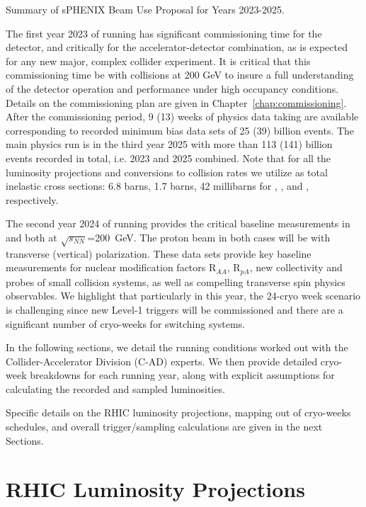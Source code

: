 \begin{table}[]
\centering
\caption{Summary of sPHENIX Beam Use Proposal for Years 2023-2025.
\label{tab:summary}}
\bigskip
\centering

\end{table}

The first year 2023 of running has significant commissioning time for the detector, and critically for the accelerator-detector combination, as is expected for any new major, complex collider experiment.   It is critical that this commissioning time be with \auau collisions at 200 GeV to insure a full understanding of the detector operation and performance under high occupancy conditions.   Details on the commissioning plan are given in Chapter~\ref{chap:commissioning}.    After the commissioning period, 9 (13) weeks of physics data taking are available corresponding to recorded \auau minimum bias data sets of 25 (39) billion events.   The main \auau physics run is in the third year 2025 with more than 113 (141) billion events recorded in total, i.e. 2023 and 2025 combined.
Note that for all the luminosity projections and conversions to collision rates we utilize as total inelastic cross sections:   6.8 barns, 1.7 barns, 42 millibarns for \auau, \pau, and \pp, respectively.

The second year 2024 of running provides the critical baseline measurements in \pp and \pau both at $\sqrt{s_{NN}}$=200~GeV.   The proton beam in both cases will be with transverse (vertical) polarization.  These data sets provide key baseline measurements for nuclear modification factors R$_{AA}$, R$_{pA}$, new collectivity and probes of small collision systems, as well as compelling transverse spin physics observables.    We highlight that particularly in this year, the 24-cryo week scenario is challenging since new Level-1 triggers will be commissioned and there are a significant number of cryo-weeks for switching systems.    

In the following sections, we detail the running conditions worked out with the Collider-Accelerator Division (C-AD) experts.    We then provide detailed cryo-week breakdowns for each running year, along with explicit assumptions for calculating the recorded and sampled luminosities.   

Specific details on the RHIC luminosity projections, mapping out of cryo-weeks schedules, and overall trigger/sampling calculations are given in the next Sections.

\section{RHIC Luminosity Projections}

